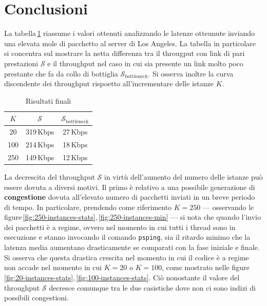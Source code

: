 \newpage\section{Conclusioni}\label{conclusions}
La tabella\,\ref{tab:summary} riassume i valori ottenuti analizzando le latenze otteunute inviando una elevata mole di pacchetto al server di Los Angeles. La tabella in particolare si concentra sul mostrare la netta differenza tra il througput con link di pari prestazioni $\mathcal{S}$ e il throughput nel caso in cui sia presente un link molto poco prestante che fa da collo di bottiglia $\mathcal{S}_{\text{bottleneck}}$. Si osserva inoltre la curva discendente dei throughput rispoetto all'incrementare delle istanze $K$.
\begin{table}[h]
    \centering
    \caption{Risultati finali}\vspace{7.5px}
    \renewcommand{\arraystretch}{1.5}
    \begin{tabular}{| c | c c |}
        \hline
        $K$ & $\mathcal{S}$ & $\mathcal{S}_{\text{bottleneck}}$ \\\hline\hline
        20  & 319\,Kbps & 27\,Kbps \\
        100 & 214\,Kbps & 18\,Kbps \\
        250 & 149\,Kbps & 12\,Kbps \\
        \hline
    \end{tabular}
    \renewcommand{\arraystretch}{1}
    \label{tab:summary}
\end{table}
La decrescita del throughput $\mathcal{S}$ in virtù dell'aumento del numero delle istanze può essere dovuta a diversi motivi. Il primo è relativo a una possibile generazione di \textbf{congestione} dovuta all'elevato numero di pacchetti inviati in un breve periodo di tempo. In particolare, prendendo come riferimento $K = 250$ — osservando le figure\,\ref{fig:250-instances-stats},\,\ref{fig:250-instances-min} — si nota che quando l'invio dei pacchetti è a regime, ovvero nel momento in cui tutti i thread sono in esecuzione e stanno invocando il comando \texttt{psping}, sia il ritardo minimo che la latenza media aumentano drasticamente se comparati con la fase iniziale e finale. Si osserva che questa drastica crescita nel momento in cui il codice è a regime non accade nel momento in cui $K = 20$ o $K = 100$, come mostrato nelle figure\,\ref{fig:20-instances-stats},\,\ref{fig:100-instances-stats}. Ciò nonostante il valore del throughput $\mathcal{S}$ decresce comunque tra le due casistiche dove non ci sono indizi di possibili congestioni.

